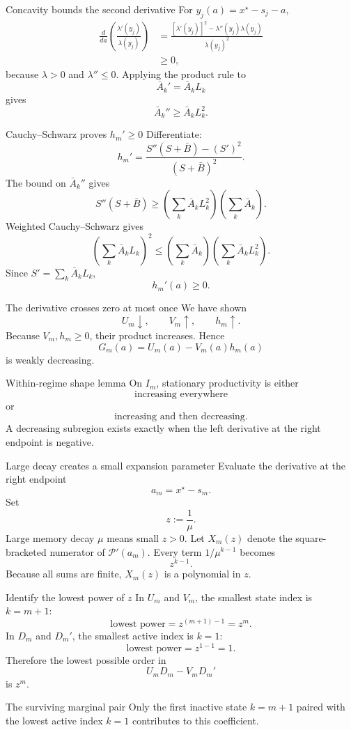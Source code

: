 \documentclass[aspectratio=169,10pt]{beamer}
\newcommand{\calP}{\mathcal{P}}
\begin{document}
\begin{frame}{Concavity bounds the second derivative}
For $y_j(a)=x^\star-s_j-a$,
\begin{align*}
\frac{d}{da}
\left(
\frac{\lambda'(y_j)}{\lambda(y_j)}
\right)
&=
\frac{
[\lambda'(y_j)]^2
-\lambda''(y_j)\lambda(y_j)}
{\lambda(y_j)^2}\\
&\ge0,
\end{align*}
because $\lambda>0$ and $\lambda''\le0$.
\vspace{2mm}
Applying the product rule to
\[
\bar A_k'=\bar A_kL_k
\]
gives
\[
\boxed{
\bar A_k''
\ge
\bar A_kL_k^2.}
\]
\end{frame}

\begin{frame}{Cauchy--Schwarz proves \texorpdfstring{$h_m'\ge0$}{hm' >= 0}}
Differentiate:
\[
h_m'=
\frac{
S''(S+\bar B)-(S')^2}
{(S+\bar B)^2}.
\]
The bound on $\bar A_k''$ gives
\[
S''(S+\bar B)
\ge
\left(\sum_k\bar A_kL_k^2\right)
\left(\sum_k\bar A_k\right).
\]
Weighted Cauchy--Schwarz gives
\[
\left(\sum_k\bar A_kL_k\right)^2
\le
\left(\sum_k\bar A_k\right)
\left(\sum_k\bar A_kL_k^2\right).
\]
Since $S'=\sum_k\bar A_kL_k$,
\[
\boxed{h_m'(a)\ge0.}
\]
\end{frame}

\begin{frame}{The derivative crosses zero at most once}
We have shown
\[
U_m\downarrow,
\qquad
V_m\uparrow,
\qquad
h_m\uparrow.
\]
Because $V_m,h_m\ge0$, their product increases. Hence
\[
G_m(a)=U_m(a)-V_m(a)h_m(a)
\]
is weakly decreasing.
\begin{block}{Within-regime shape lemma}
On $I_m$, stationary productivity is either
\[
\text{increasing everywhere}
\]
or
\[
\text{increasing and then decreasing}.
\]
A decreasing subregion exists exactly when the left derivative at the right endpoint is negative.
\end{block}
\end{frame}

\begin{frame}{Large decay creates a small expansion parameter}
Evaluate the derivative at the right endpoint
\[
a_m=x^\star-s_m.
\]
Set
\[
z:=\frac1\mu.
\]
Large memory decay $\mu$ means small $z>0$.
\vspace{3mm}
Let $X_m(z)$ denote the square-bracketed numerator of $\calP'(a_m)$. Every term $1/\mu^{k-1}$ becomes
\[
z^{k-1}.
\]
Because all sums are finite, $X_m(z)$ is a polynomial in $z$.
\end{frame}

\begin{frame}{Identify the lowest power of \texorpdfstring{$z$}{z}}
In $U_m$ and $V_m$, the smallest state index is $k=m+1$:
\[
\text{lowest power}=z^{(m+1)-1}=z^m.
\]
In $D_m$ and $D_m'$, the smallest active index is $k=1$:
\[
\text{lowest power}=z^{1-1}=1.
\]
Therefore the lowest possible order in
\[
U_mD_m-V_mD_m'
\]
is $z^m$.
\begin{block}{The surviving marginal pair}
Only the first inactive state $k=m+1$ paired with the lowest active index $k=1$ contributes to this coefficient.
\end{block}
\end{frame}
\end{document}
